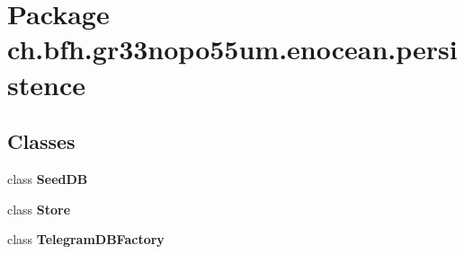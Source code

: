 \section{Package ch.\+bfh.\+gr33nopo55um.\+enocean.\+persistence}
\label{namespacech_1_1bfh_1_1gr33nopo55um_1_1enocean_1_1persistence}
\subsection*{Classes}
\begin{DoxyCompactItemize}
\item 
class {\bf Seed\+DB}
\item 
class {\bf Store}
\item 
class {\bf Telegram\+D\+B\+Factory}
\end{DoxyCompactItemize}
